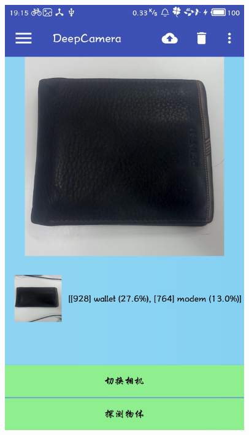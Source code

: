 \documentclass[UTF8, Microsoft YaHei]{book}
\begin{document}
    \begin{figure}[!htb]
    \centering
    \begin{minipage}[c]{0.33\textwidth}
    \centering
    \includegraphics[width=0.92\textwidth]{img/test3.png}
    \end{minipage}%
    \begin{minipage}[c]{0.33\textwidth}
    \centering

\end{minipage}
\end{figure}
\end{document}
